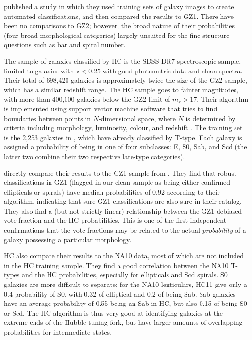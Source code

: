 \documentclass[useAMS,usenatbib]{mn2e}
\begin{document}
\citet[][HC]{hue11} published a study in which they used training sets of galaxy images to create automated classifications, and then compared the results to GZ1. There have been no comparisons to GZ2; however, the broad nature of their probabilities (four broad morphological categories) largely unsuited for the fine structure questions such as bar and spiral number. 

The sample of galaxies classified by HC is the SDSS DR7 spectroscopic sample, limited to galaxies with $z<0.25$ with good photometric data and clean spectra. Their total of 698,420 galaxies is approximately twice the size of the GZ2 sample, which has a similar redshift range. The HC sample goes to fainter magnitudes, with more than 400,000 galaxies below the GZ2 limit of $m_r>17$. Their algorithm is implemented using support vector machine software that tries to find boundaries between points in $N$-dimensional space, where $N$ is determined by criteria including morphology, luminosity, colour, and redshift \citep{hue08}. The training set is the 2,253 galaxies in \citet{fuk07}, which have already classified by T-type. Each galaxy is assigned a probability of being in one of four subclasses: E, S0, Sab, and Scd (the latter two combine their two respective late-type categories). 

\citet{hue11} directly compare their results to the GZ1 sample from \citet{lin11}. They find that robust classifications in GZ1 (flagged in our clean sample as being either confirmed ellipticals or spirals) have median probabilities of 0.92 according to their algorithm, indicating that sure GZ1 classifications are also sure in their catalog. They also find a (but not strictly linear) relationship between the GZ1 debiased vote fraction and the HC probabilities. This is one of the first independent confirmations that the vote fractions may be related to the actual {\em probability} of a galaxy possessing a particular morphology. 

HC also compare their results to the NA10 data, most of which are not included in the HC training sample. They find a good correlation between the NA10 T-types and the HC probabilities, especially for ellipticals and Scd spirals. S0 galaxies are more difficult to separate; for the NA10 lenticulars, HC11 give only a 0.4 probability of S0, with 0.32 of elliptical and 0.2 of being Sab. Sab galaxies have an average probability of 0.55 being an Sab in HC, but also 0.15 of being S0 or Scd. The HC algorithm is thus very good at identifying galaxies at the extreme ends of the Hubble tuning fork, but have larger amounts of overlapping probabilities for intermediate states. 
\end{document}
